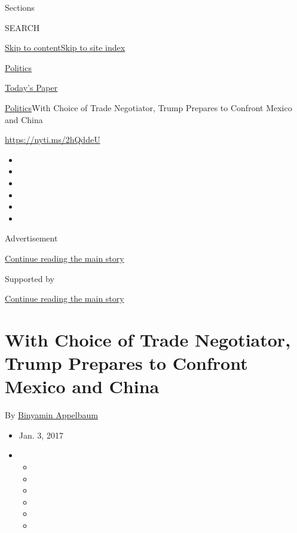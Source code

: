 Sections

SEARCH

\protect\hyperlink{site-content}{Skip to
content}\protect\hyperlink{site-index}{Skip to site index}

\href{https://www.nytimes.com/section/politics}{Politics}

\href{https://myaccount.nytimes.com/auth/login?response_type=cookie\&client_id=vi}{}

\href{https://www.nytimes.com/section/todayspaper}{Today's Paper}

\href{/section/politics}{Politics}\textbar{}With Choice of Trade
Negotiator, Trump Prepares to Confront Mexico and China

\url{https://nyti.ms/2hQddeU}

\begin{itemize}
\item
\item
\item
\item
\item
\item
\end{itemize}

Advertisement

\protect\hyperlink{after-top}{Continue reading the main story}

Supported by

\protect\hyperlink{after-sponsor}{Continue reading the main story}

\hypertarget{with-choice-of-trade-negotiator-trump-prepares-to-confront-mexico-and-china}{%
\section{With Choice of Trade Negotiator, Trump Prepares to Confront
Mexico and
China}\label{with-choice-of-trade-negotiator-trump-prepares-to-confront-mexico-and-china}}

By \href{http://www.nytimes.com/by/binyamin-appelbaum}{Binyamin
Appelbaum}

\begin{itemize}
\item
  Jan. 3, 2017
\item
  \begin{itemize}
  \item
  \item
  \item
  \item
  \item
  \item
  \end{itemize}
\end{itemize}

